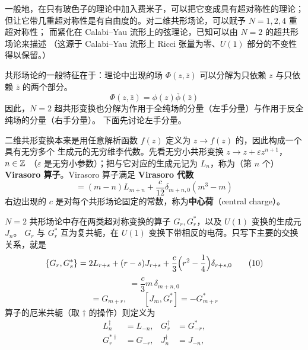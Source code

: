 一般地，在只有玻色子的理论中加入费米子，可以把它变成具有超对称性的理论；
但让它带几重超对称性是有自由度的。对二维共形场论，可以赋予 $N=1,2,4$ 重超对称性；
而紧化在 Calabi--Yau 流形上的弦理论，已知可以由 $N=2$ 的超共形场论来描述
（这源于 Calabi--Yau 流形上 Ricci 张量为零、$U(1)$ 部分的不变性得以保留。）

共形场论的一般特征在于：理论中出现的场 $\Phi(z,\bar z)$ 可以分解为只依赖 $z$
与只依赖 $\bar z$ 的两个部分。
\begin{equation}
  \Phi(z,\bar z)=\phi(z)\bar\phi(\bar z) \tag{8}
\end{equation}
因此，$N=2$ 超共形变换也分解为作用于全纯场的分量（左手分量）与作用于反全纯场的分量（右手分量）。
下面先讨论左手分量。

二维共形变换本来是用任意解析函数 $f(z)$ 定义为 $z\to f(z)$ 的，因此构成一个具有无穷多个
生成元的无穷维李代数。先看无穷小共形变换 $z\to z+\varepsilon z^{n+1}$，$n\in\mathbb{Z}$
（$\varepsilon$ 是无穷小参数）；把与它对应的生成元记为 $L_n$，称为（第 $n$ 个）
\textbf{Virasoro 算子}。Virasoro 算子满足 \textbf{Virasoro 代数}
\begin{equation}
  [L_m,L_n]=(m-n)L_{m+n}+\frac{c}{12}\delta_{m+n,0}(m^3-m) \tag{9}
\end{equation}
右边出现的 $c$ 是对每个共形场论固定的常数，称为\textbf{中心荷}（central charge）。

$N=2$ 共形场论中存在两类超对称变换的算子 $G_r,G_r^{*}$，以及 $U(1)$ 变换的生成元 $J_n$。
$G_r$ 与 $G_r^{*}$ 互为复共轭，在 $U(1)$ 变换下带相反的电荷。只写下主要的交换关系，就是
\begin{equation}
  \{G_r,G_s^{*}\}=2L_{r+s}+(r-s)J_{r+s}+\frac{c}{3}\Bigl(r^2-\frac14\Bigr)\delta_{r+s,0} \tag{10}
\end{equation}
\begin{equation}
  [J_m,J_n]=\frac{c}{3}m\,\delta_{m+n,0} \tag{11}
\end{equation}
\begin{equation}
  [J_m,G_r]=G_{m+r},\qquad [J_m,G_r^{*}]=-G_{m+r}^{*} \tag{12}
\end{equation}
算子的厄米共轭（取 $\dagger$ 的操作）则定义为
\begin{equation}
  \begin{aligned}
    L_n^{\dagger}&=L_{-n}, & G_r^{\dagger}&=G_{-r}^{*},\\
    G_r^{*\dagger}&=G_{-r}, & J_n^{\dagger}&=J_{-n},
  \end{aligned} \tag{13}
\end{equation}

